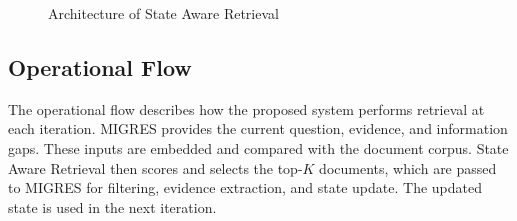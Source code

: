 \documentclass[12pt,a4paper]{report}
\begin{document}
\begin{figure}[H]

\caption{Architecture of State Aware Retrieval}
\label{fig:gar-architecture}
\end{figure}

\clearpage

\subsection{Operational Flow}

The operational flow describes how the proposed system performs retrieval at each iteration. MIGRES provides the current question, evidence, and information gaps. These inputs are embedded and compared with the document corpus. State Aware Retrieval then scores and selects the top-$K$ documents, which are passed to MIGRES for filtering, evidence extraction, and state update. The updated state is used in the next iteration.
\end{document}
